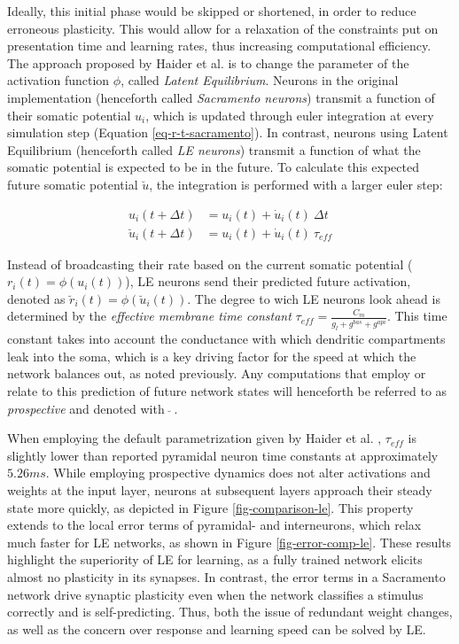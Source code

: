 Ideally, this initial phase would be skipped or shortened, in order to reduce erroneous plasticity. This would allow for
a relaxation of the constraints put on presentation time and learning rates, thus increasing computational efficiency.
The approach proposed by Haider et al. is to change the parameter of the activation function $\phi$, called
\textit{Latent Equilibrium}. Neurons in the original implementation (henceforth called \textit{Sacramento neurons})
transmit a function of their somatic potential $u_i$, which is updated through euler integration at every simulation
step (Equation \ref{eq-r-t-sacramento}). In contrast, neurons using Latent Equilibrium (henceforth called \textit{LE
neurons}) transmit a function of what the somatic potential is expected to be in the future. To calculate this expected
future somatic potential $\breve{u}$, the integration is performed with a larger euler step:

\begin{align}
  u_i(t+ \Delta t)          & = u_i(t) + \dot{u}_i(t) \ \Delta t \label{eq-r-t-sacramento} \\
  \breve{u}_i(t + \Delta t) & = u_i(t) + \dot{u}_i(t) \ \tau_{eff} \label{eq-r-t-haider}
\end{align}

Instead of broadcasting their rate based on the current somatic potential ($r_i(t) = \phi(u_i(t))$), LE neurons send
their predicted future activation, denoted as $\breve{r}_i(t) = \phi(\breve{u}_i(t))$. The degree to wich LE neurons
look ahead is determined by the \textit{effective membrane time constant} $\tau_{eff} = \frac{C_m}{g_l + g^{bas} +
g^{api}}$. This time constant takes into account the conductance with which dendritic compartments leak into the soma,
which is a key driving factor for the speed at which the network balances out, as noted previously. Any computations
that employ or relate to this prediction of future network states will henceforth be referred to as \textit{prospective}
and denoted with $\ \breve{} \ $.

When employing the default parametrization given by Haider et al. , $\tau_{eff}$ is
slightly lower than reported pyramidal neuron time constants \citep{McCormick1985} at approximately $5.26ms$. While
employing prospective dynamics does not alter activations and weights at the input layer, neurons at subsequent layers
approach their steady state more quickly, as depicted in Figure \ref{fig-comparison-le}. This property extends to the
local error terms of pyramidal- and interneurons, which relax much faster for LE networks, as shown in Figure
\ref{fig-error-comp-le}. These results highlight the superiority of LE for learning, as a fully trained network elicits
almost no plasticity in its synapses. In contrast, the error terms in a Sacramento network drive synaptic plasticity
even when the network classifies a stimulus correctly and is self-predicting. Thus, both the issue of redundant
weight changes, as well as the concern over response and learning speed can be solved by LE.\newline


